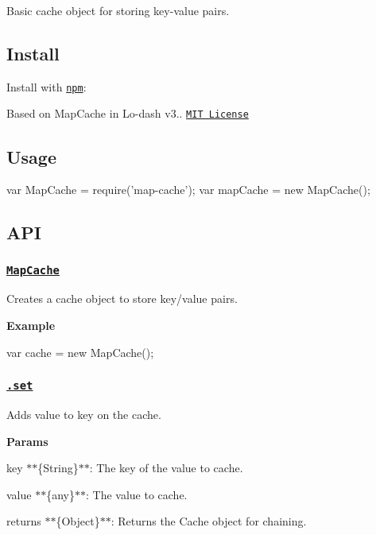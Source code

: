 Basic cache object for storing key-\/value pairs.

\subsection*{Install}

Install with \href{https://www.npmjs.com/}{\tt npm}\+:




Based on Map\+Cache in Lo-\/dash v3.. \href{https://github.com/lodash/lodash/blob/master/LICENSE.txt}{\tt M\+IT License}

\subsection*{Usage}


\begin{DoxyCode}
var MapCache = require('map-cache');
var mapCache = new MapCache();
\end{DoxyCode}


\subsection*{A\+PI}

\subsubsection*{\href{index.js#L28}{\tt Map\+Cache}}

Creates a cache object to store key/value pairs.

{\bfseries Example}


\begin{DoxyCode}
var cache = new MapCache();
\end{DoxyCode}


\subsubsection*{\href{index.js#L45}{\tt .set}}

Adds {\ttfamily value} to {\ttfamily key} on the cache.

{\bfseries Params}


\begin{DoxyItemize}
\item {\ttfamily key} $\ast$$\ast$\{String\}$\ast$$\ast$\+: The key of the value to cache.
\item {\ttfamily value} $\ast$$\ast$\{any\}$\ast$$\ast$\+: The value to cache.
\item {\ttfamily returns} $\ast$$\ast$\{Object\}$\ast$$\ast$\+: Returns the {\ttfamily Cache} object for chaining.
\end{DoxyItemize}

